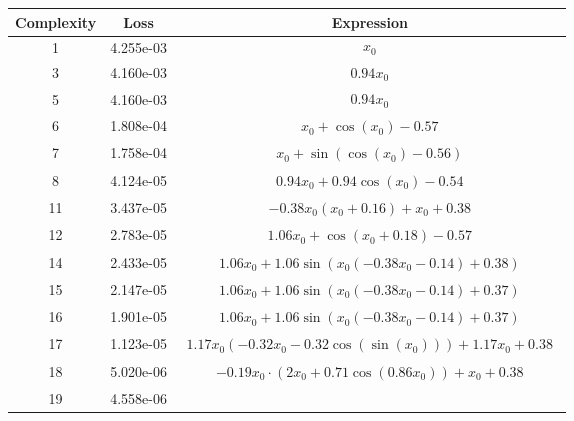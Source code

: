 \begin{center}
        \begin{tabular}{|c|c|c|}
        \hline
        Complexity & Loss & Expression \\
        \hline
        1 & 4.255e-03 & $\begin{aligned}x_{0}\end{aligned}$\\ \hline3 & 4.160e-03 & $\begin{aligned}0.94 x_{0}\end{aligned}$\\ \hline5 & 4.160e-03 & $\begin{aligned}0.94 x_{0}\end{aligned}$\\ \hline6 & 1.808e-04 & $\begin{aligned}x_{0} + \cos{\left(x_{0} \right)} - 0.57\end{aligned}$\\ \hline7 & 1.758e-04 & $\begin{aligned}x_{0} + \sin{\left(\cos{\left(x_{0} \right)} - 0.56 \right)}\end{aligned}$\\ \hline8 & 4.124e-05 & $\begin{aligned}0.94 x_{0} + 0.94 \cos{\left(x_{0} \right)} - 0.54\end{aligned}$\\ \hline11 & 3.437e-05 & $\begin{aligned}- 0.38 x_{0} \left(x_{0} + 0.16\right) + x_{0} + 0.38\end{aligned}$\\ \hline12 & 2.783e-05 & $\begin{aligned}1.06 x_{0} + \cos{\left(x_{0} + 0.18 \right)} - 0.57\end{aligned}$\\ \hline14 & 2.433e-05 & $\begin{aligned}1.06 x_{0} + 1.06 \sin{\left(x_{0} \left(- 0.38 x_{0} - 0.14\right) + 0.38 \right)}\end{aligned}$\\ \hline15 & 2.147e-05 & $\begin{aligned}1.06 x_{0} + 1.06 \sin{\left(x_{0} \left(- 0.38 x_{0} - 0.14\right) + 0.37 \right)}\end{aligned}$\\ \hline16 & 1.901e-05 & $\begin{aligned}1.06 x_{0} + 1.06 \sin{\left(x_{0} \left(- 0.38 x_{0} - 0.14\right) + 0.37 \right)}\end{aligned}$\\ \hline17 & 1.123e-05 & $\begin{aligned}1.17 x_{0} \left(- 0.32 x_{0} - 0.32 \cos{\left(\sin{\left(x_{0} \right)} \right)}\right) + 1.17 x_{0} + 0.38\end{aligned}$\\ \hline18 & 5.020e-06 & $\begin{aligned}- 0.19 x_{0} \cdot \left(2 x_{0} + 0.71 \cos{\left(0.86 x_{0} \right)}\right) + x_{0} + 0.38\end{aligned}$\\ \hline19 & 4.558e-06 & 
\end{tabular}
\end{center}

